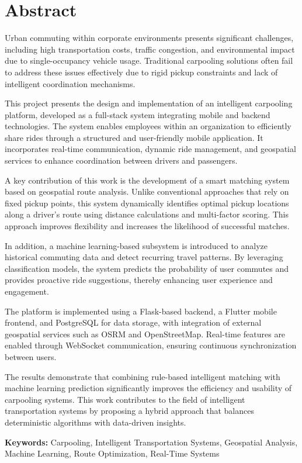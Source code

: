 \begingroup
\setlength{\parskip}{6pt} %
\linespread{1.2} %
\chapter*{Abstract}

Urban commuting within corporate environments presents significant challenges, including high transportation costs, traffic congestion, and environmental impact due to single-occupancy vehicle usage. Traditional carpooling solutions often fail to address these issues effectively due to rigid pickup constraints and lack of intelligent coordination mechanisms.

This project presents the design and implementation of an intelligent carpooling platform, developed as a full-stack system integrating mobile and backend technologies. The system enables employees within an organization to efficiently share rides through a structured and user-friendly mobile application. It incorporates real-time communication, dynamic ride management, and geospatial services to enhance coordination between drivers and passengers.

A key contribution of this work is the development of a smart matching system based on geospatial route analysis. Unlike conventional approaches that rely on fixed pickup points, this system dynamically identifies optimal pickup locations along a driver's route using distance calculations and multi-factor scoring. This approach improves flexibility and increases the likelihood of successful matches.

In addition, a machine learning-based subsystem is introduced to analyze historical commuting data and detect recurring travel patterns. By leveraging classification models, the system predicts the probability of user commutes and provides proactive ride suggestions, thereby enhancing user experience and engagement.

The platform is implemented using a Flask-based backend, a Flutter mobile frontend, and PostgreSQL for data storage, with integration of external geospatial services such as OSRM and OpenStreetMap. Real-time features are enabled through WebSocket communication, ensuring continuous synchronization between users.

The results demonstrate that combining rule-based intelligent matching with machine learning prediction significantly improves the efficiency and usability of carpooling systems. This work contributes to the field of intelligent transportation systems by proposing a hybrid approach that balances deterministic algorithms with data-driven insights.

\textbf{Keywords:} Carpooling, Intelligent Transportation Systems, Geospatial Analysis, Machine Learning, Route Optimization, Real-Time Systems
\endgroup
